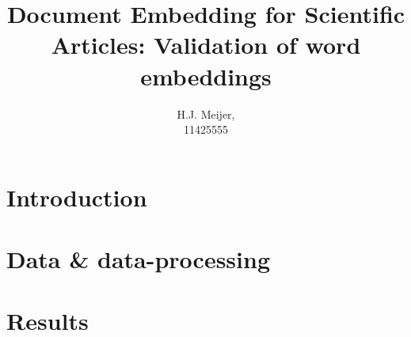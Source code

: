 \documentclass[10pt,a4paper]{article}
\newcommand{\mainheader}[1]{\section{#1}}
\begin{document}
\begin{titlepage}
\title{Document Embedding for Scientific Articles: Validation of word embeddings}
\author{H.J. Meijer,\\11425555}
\clearpage\maketitle\thispagestyle{empty}

\end{titlepage}

\mainheader{Introduction}


\clearpage

\clearpage
%
\clearpage

\mainheader{Data \& data-processing}

\clearpage

\mainheader{Results}

\clearpage



\clearpage



\end{document}
